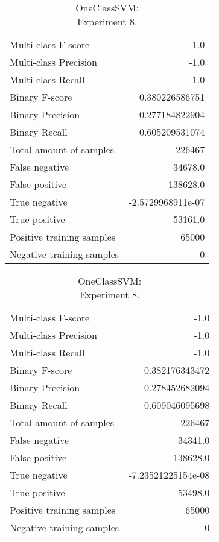 \begin{table}[H]
\begin{minipage}{0.5\textwidth}

\caption{OneClassSVM: \\Experiment 7.}

\centering
\begin{tabular}{l r}
\toprule
Multi-class F-score & -1.0 \\
Multi-class Precision & -1.0 \\
Multi-class Recall & -1.0 \\
\midrule
Binary F-score & 0.380226586751 \\
Binary Precision & 0.277184822904 \\
Binary Recall & 0.605209531074 \\
\midrule
Total amount of samples & 226467 \\
False negative & 34678.0 \\
False positive & 138628.0 \\
True negative & -2.5729968911e-07 \\
True positive & 53161.0 \\
\midrule
Positive training samples & 65000 \\
Negative training samples & 0 \\
\bottomrule
\end{tabular}
\end{minipage}
\hfillx
\begin{minipage}{0.5\textwidth}

\caption{OneClassSVM: \\Experiment 8.}

\centering
\begin{tabular}{l r}
\toprule
Multi-class F-score & -1.0 \\
Multi-class Precision & -1.0 \\
Multi-class Recall & -1.0 \\
\midrule
Binary F-score & 0.382176343472 \\
Binary Precision & 0.278452682094 \\
Binary Recall & 0.609046095698 \\
\midrule
Total amount of samples & 226467 \\
False negative & 34341.0 \\
False positive & 138628.0 \\
True negative & -7.23521225154e-08 \\
True positive & 53498.0 \\
\midrule
Positive training samples & 65000 \\
Negative training samples & 0 \\
\bottomrule
\end{tabular}
\end{minipage}
\end{table}
